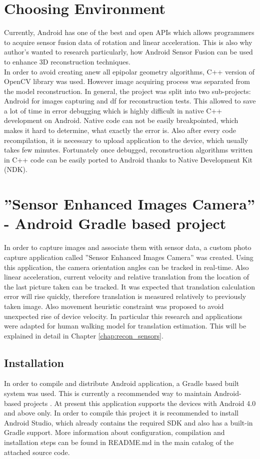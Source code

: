 \section{Choosing Environment}
Currently, Android has one of the best and open APIs which allows programmers to acquire sensor fusion data of rotation and linear acceleration. This is also why author's wanted to research particularly, how Android Sensor Fusion can be used to enhance 3D reconstruction techniques.
\\
In order to avoid creating anew all epipolar geometry algorithms, C++ version of OpenCV library was used. However image acquiring process was separated from the model reconstruction. In general, the project was split into two sub-projects: Android for images capturing and df for reconstruction tests. This allowed to save a lot of time in error debugging which is highly difficult in native C++ development on Android. Native code can not be easily breakpointed, which makes it hard to determine, what exactly the error is. Also after every code recompilation, it is necessary to upload application to the device, which usually takes few minutes.
Fortunately once debugged, reconstruction algorithms written in C++ code can be easily ported to Android thanks to Native Development Kit (NDK). 
\section{''Sensor Enhanced Images Camera'' - Android Gradle based project}
In order to capture images and associate them with sensor data, a custom photo capture application called ''Sensor Enhanced Images Camera'' was created.
Using this application, the camera orientation angles can be tracked in real-time. Also linear acceleration, current velocity and relative translation from the location of the last picture taken can be tracked. It was expected that translation calculation error will rise quickly, therefore translation is measured relatively to previously taken image. Also movement heuristic constraint was proposed to avoid unexpected rise of device velocity. In particular this research and applications were adapted for human walking model for translation estimation. This will be explained in detail in Chapter \ref{chap:recon_sensors}.
\subsection{Installation}
In order to compile and distribute Android application, a Gradle based built system was used. This is currently a recommended way to maintain Android-based projects \cite{website:gradle}. 
At present this application supports the devices with Android 4.0 and above only. In order to compile this project it is recommended to install Android Studio, which already contains the required SDK and also has a built-in Gradle support. More information about configuration, compilation and installation steps can be found in README.md in the main catalog of the attached source code. 
